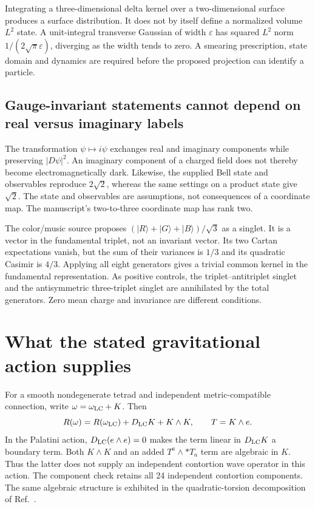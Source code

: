 \documentclass[11pt]{article}
\begin{document}
Integrating a three-dimensional delta kernel over a two-dimensional
surface produces a surface distribution. It does not by itself define
a normalized volume $L^2$ state. A unit-integral transverse Gaussian
of width $\varepsilon$ has squared $L^2$ norm
$1/(2\sqrt\pi\varepsilon)$, diverging as the width tends to zero.
A smearing prescription, state domain and dynamics are required before
the proposed projection can identify a particle.

\subsection{Gauge-invariant statements cannot depend on real versus imaginary labels}
The transformation $\psi\mapsto i\psi$ exchanges real and imaginary
components while preserving $|D\psi|^2$. An imaginary component of a
charged field does not thereby become electromagnetically dark.
Likewise, the supplied Bell state and observables reproduce $2\sqrt2$,
whereas the same settings on a product state give $\sqrt2$. The state
and observables are assumptions, not consequences of a coordinate map.
The manuscript's two-to-three coordinate map has rank two.

The color/music source proposes $(|R\rangle+|G\rangle+|B\rangle)/\sqrt3$
as a singlet. It is a vector in the fundamental triplet, not an invariant
vector. Its two Cartan expectations vanish, but the sum of their variances
is $1/3$ and its quadratic Casimir is $4/3$. Applying all eight generators
gives a trivial common kernel in the fundamental representation.
As positive controls, the triplet--antitriplet singlet and the
antisymmetric three-triplet singlet are annihilated by the total generators.
Zero mean charge and invariance are different conditions.

\section{What the stated gravitational action supplies}
For a smooth nondegenerate tetrad and independent metric-compatible
connection, write $\omega=\omega_{\rm LC}+K$. Then
\begin{equation}
 R(\omega)=R(\omega_{\rm LC})+D_{\rm LC}K+K\wedge K,
 \qquad T=K\wedge e.
\end{equation}
In the Palatini action, $D_{\rm LC}(e\wedge e)=0$ makes the term
linear in $D_{\rm LC}K$ a boundary term. Both $K\wedge K$ and an
added $T^a\wedge *T_a$ term are algebraic in $K$. Thus the latter
does not supply an independent contortion wave operator in this action.
The component check retains all 24 independent contortion components.
The same algebraic structure is exhibited in the quadratic-torsion
decomposition of Ref.~\cite{Torsion}.
\end{document}
